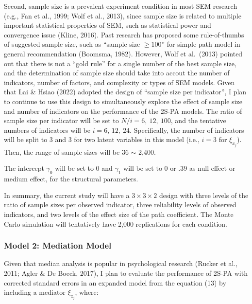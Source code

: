 \documentclass[
  man]{apa7}
\begin{document}
Second, sample size is a prevalent experiment condition in most SEM research (e.g., Fan et al., 1999; Wolf et al., 2013), since sample size is related to multiple important statistical properties of SEM, such as statistical power and convergence issue (Kline, 2016). Past research has proposed some rule-of-thumbs of suggested sample size, such as ``sample size \(\ge 100\)'' for simple path model in general recommendation (Boomsma, 1982). However, Wolf et al.~(2013) pointed out that there is not a ``gold rule'' for a single number of the best sample size, and the determination of sample size should take into accout the number of indicators, number of factors, and complexity or types of SEM models. Given that Lai \& Hsiao (2022) adopted the design of ``sample size per indicator'', I plan to continue to use this design to simultaneously explore the effect of sample size and number of indicators on the performance of the 2S-PA models. The ratio of sample size per indicator will be set to \(N/i = 6, \ 12, \ 100\), and the tentative numbers of indicators will be \(i = 6, \, 12, \ 24\). Specifically, the number of indicators will be split to 3 and 3 for two latent variables in this model (i.e., \(i = 3\) for \(\xi_{x_{j}}\)). Then, the range of sample sizes will be 36 \(\sim\) 2,400.

The intercept \(\gamma_{0}\) will be set to 0 and \(\gamma_{1}\) will be set to 0 or .39 as null effect or medium effect, for the structural parameters.

In summary, the current study will have a \(3 \times 3 \times 2\) design with three levels of the ratio of sample sizes per observed indicator, three reliability levels of observed indicators, and two levels of the effect size of the path coefficient. The Monte Carlo simulation will tentatively have 2,000 replications for each condition.

\hypertarget{model-2-mediation-model}{%
\subsubsection{Model 2: Mediation Model}\label{model-2-mediation-model}}

Given that median analysis is popular in psychological research (Rucker et al., 2011; Agler \& De Boeck, 2017), I plan to evaluate the performance of 2S-PA with corrected standard errors in an expanded model from the equation (13) by including a mediator \(\xi_{z_{j}}\), where:
\end{document}
